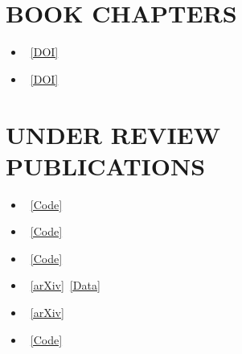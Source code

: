 \documentclass[letterpaper,11pt]{article}
\newcommand{\doiLink}[1]{\href{https://doi.org/#1}{[DOI]}}
\newcommand{\codeLink}[1]{\href{#1}{[Code]}}
\newcommand{\dataLink}[1]{\href{#1}{[Data]}}
\newcommand{\arxivLink}[1]{\href{#1}{[arXiv]}}
\begin{document}
\section{BOOK CHAPTERS}
\begin{itemize}[leftmargin=0.15in, label={}]
    \setlength{\itemsep}{-2pt} %
    \item {}~\doiLink{10.1007/978-3-030-97940-9_200}
    \item {}~\doiLink{10.1007/978-3-030-97940-9_196}
\end{itemize}

\section{UNDER REVIEW PUBLICATIONS}
\begin{itemize}[leftmargin=0.15in, label={}]
    \setlength{\itemsep}{-2pt} %
    \item {}~\codeLink{https://github.com/pebeigi/MaC-PDWM}
    \item {}~\codeLink{https://github.com/pebeigi/U-ResMARL}
    \item {}~\codeLink{https://github.com/pebeigi/AD-in-Weak-Lane-Traffic}
    \item {}~\arxivLink{https://arxiv.org/abs/2610.32276}~\dataLink{https://catalog.data.gov/dataset/third-generation-simulation-data-tgsim-foggy-bottom-trajectories}
    \item {}~\arxivLink{https://arxiv.org/abs/2610.27509}
    \item {}~\codeLink{https://github.com/pebeigi/PAPL-TSC}
\end{itemize}



\newpage
\vspace*{4pt}
\end{document}
